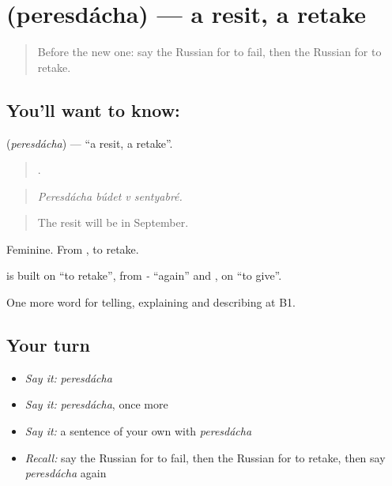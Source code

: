 \section[\texorpdfstring{\ru{пересдача} (peresdácha)}{пересдача (peresdácha)}]{ (peresdácha) — a resit, a retake}

\label{lesson:RU-C382-peresdacha}



\begin{quote}
Before the new one: say the Russian for to fail, then the Russian for to retake.
\end{quote}

\subsection*{You'll want to know: }
\textbf{} (\emph{peresdácha}) — \textquotedblleft{}a resit, a retake\textquotedblright{}.

\begin{quote}
   .
\end{quote}

\begin{quote}
\emph{Peresdácha búdet v sentyabré.}
\end{quote}

\begin{quote}
The resit will be in September.
\end{quote}

Feminine. From \emph{}, to retake.

\begin{cousinweb}
\textbf{} is built on \emph{} \textquotedblleft{}to retake\textquotedblright{}, from \emph{-} \textquotedblleft{}again\textquotedblright{} and \emph{}, on \emph{} \textquotedblleft{}to give\textquotedblright{}.
\end{cousinweb}

\begin{grammarlens}[title={What you've built}]
One more word for telling, explaining and describing at B1.
\end{grammarlens}

\subsection*{Your turn}
\begin{itemize}
\raggedright
  \item \emph{Say it:} \emph{peresdácha}
  \item \emph{Say it:} \emph{peresdácha}, once more
  \item \emph{Say it:} a sentence of your own with \emph{peresdácha}
  \item \emph{Recall:} say the Russian for to fail, then the Russian for to retake, then say \emph{peresdácha} again
\end{itemize}

